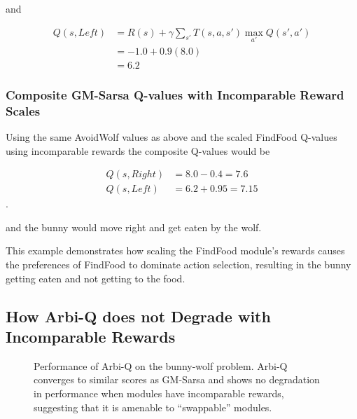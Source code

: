 and

\begin{align*}
Q(s, Left) &= R(s) + \gamma \sum_{s'} T(s, a, s') \max_{a'} Q(s', a')\\
             &= -1.0 + 0.9 (8.0)\\
             &= 6.2
\end{align*}

\subsubsection{Composite GM-Sarsa Q-values with Incomparable Reward Scales}

Using the same AvoidWolf values as above and the scaled FindFood Q-values using incomparable rewards the composite Q-values would be

\begin{align*}
  Q(s, Right) &= 8.0 - 0.4 = 7.6\\
  Q(s, Left) &= 6.2 + 0.95 = 7.15
\end{align*}.

and the bunny would move right and get eaten by the wolf.

This example demonstrates how scaling the FindFood module's rewards causes the preferences of FindFood to dominate action selection, resulting in the bunny getting eaten and not getting to the food.

\subsection{How Arbi-Q does not Degrade with Incomparable Rewards}

\begin{figure}[ht]
  \begin{center}
    \caption{Performance of Arbi-Q on the bunny-wolf problem. Arbi-Q converges to similar scores as GM-Sarsa and shows no degradation in performance when modules have incomparable rewards, suggesting that it is amenable to ``swappable'' modules.}
  \end{center}
  \label{fig:arbiq-results}
\end{figure}

